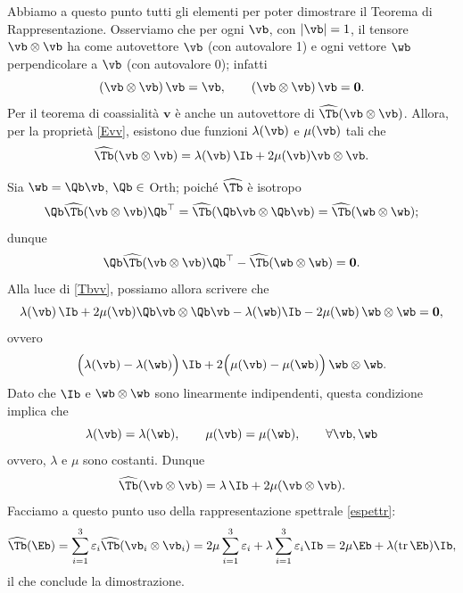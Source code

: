 Abbiamo a questo punto tutti gli elementi per poter dimostrare il Teorema di Rappresentazione. Osserviamo che per ogni $\vb$, con $|\vb|=1$, il tensore $\vb \otimes \vb$ ha come autovettore $\vb$ (con autovalore 1) e ogni vettore $\wb$ perpendicolare a $\vb$ (con autovalore 0); infatti
\begin{equation}
	(\vb \otimes \vb)\,\vb=\vb, \qquad (\vb \otimes \vb)\,\vb=\mathbf{0}.
\end{equation}
Per il teorema di coassialità $\mathbf{v}$ è anche un autovettore di $\widehat{\Tb}(\vb \otimes\vb)$. Allora, per la proprietà \eqref{Evv}, esistono due funzioni $\lambda(\vb)$ e $\mu (\vb)$ tali che
\begin{equation}\label{Tbvv}
\widehat{\Tb}(\vb \otimes \vb)=\lambda(\vb)\, \Ib+2\mu (\vb) \vb \otimes \vb.
\end{equation}

Sia $\wb =\Qb \vb$, $\Qb \in$ Orth; poiché $\widehat{\Tb}$ è isotropo
\begin{equation}
\Qb \widehat{\Tb}(\vb \otimes \vb)\Qb ^\top=\widehat{\Tb}(\Qb \vb \otimes \Qb \vb)=\widehat{\Tb}(\wb \otimes \wb);
\end{equation}
dunque
\begin{equation}
\Qb \widehat{\Tb}(\vb \otimes \vb)\Qb ^\top-\widehat{\Tb}(\wb \otimes \wb)=\mathbf{0}.
\end{equation}
Alla luce di \eqref{Tbvv}, possiamo allora  scrivere che
\begin{equation}
\lambda(\vb) \,\Ib+2\mu(\vb) \Qb \vb \otimes \Qb \vb -\lambda(\wb) \Ib -2\mu (\wb)\, \wb \otimes \wb =\mathbf{0},
\end{equation}
ovvero
\begin{equation}
	\Big(  \lambda(\vb)-\lambda(\wb) \Big)\,\Ib+2\Big(  \mu (\vb)-\mu (\wb) \Big)\,\wb \otimes \wb.
\end{equation}
Dato che $\Ib$ e $\wb \otimes \wb$ sono linearmente indipendenti, questa condizione implica che
\begin{equation}
	\lambda(\vb)=\lambda(\wb), \qquad \mu(\vb)=\mu(\wb), \qquad \forall \vb, \wb
\end{equation}
ovvero, $\lambda$ e $\mu$ sono costanti. Dunque
\begin{equation}
	\widehat{\Tb}(\vb \otimes \vb)=\lambda\, \Ib+2\mu (\vb \otimes \vb).
\end{equation}
Facciamo a questo punto uso della rappresentazione spettrale \eqref{espettr}:
\begin{equation}
\widehat{\Tb}(\Eb)=\sum_{i=1}^3 \varepsilon_i \widehat{\Tb}(\vb_i\otimes \vb_i)=2\mu \sum_{i=1}^3 \varepsilon_i +\lambda\sum_{i=1}^3 \varepsilon_i \Ib=2\mu \Eb +\lambda(\operatorname{tr}\Eb )\Ib,
\end{equation}
il che conclude la dimostrazione.







